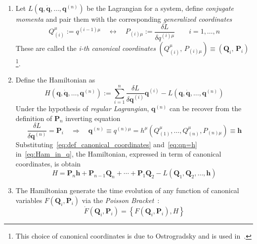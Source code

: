 \begin{enumerate}
  \item Let $L(\bm{q}, \dot{\bm{q}}, \ldots, \bm{q}^{(n)})$ be the Lagrangian
    for a system, define \emph{conjugate momenta} and pair them with the
    corresponding \emph{generalized coordinates}
    \begin{equation} \label{eq:def_canonical_coordinates}
      Q_{(i)}^{\mu} := q^{(i-1)\mu}
      \quad \leftrightarrow \quad
      P_{(i)\mu} := \frac{\delta L}{\delta q^{(i)\mu}}
      \qquad i = 1, \ldots, n
    \end{equation}
    These are called the \emph{i-th canonical coordinates}
    $(Q_{(i)}^{\mu}, \, P_{(i)\mu}) \equiv
    (\bm{Q}_{i}, \, \bm{P}_{i})$\footnote{
      This choice of canonical coordinates is due to Ostrogradsky and is used
      in~\cite{Smilga17, Chen13}.
    }.

  \item Define the Hamiltonian as
    \begin{equation} \label{eq:Ham_in_q}
      H(\bm{q}, \dot{\bm{q}}, \ldots, \bm{q}^{(n)}) :=
      \sum_{i=1}^{n} \frac{\delta L}{\delta \bm{q}^{(i)}} \bm{q}^{(i)} -
      L(\bm{q}, \dot{\bm{q}}, \ldots, \bm{q}^{(n)})
    \end{equation}
    Under the hypothesis of \emph{regular Lagrangian}, $\bm{q}^{(n)}$ can be
    recover from the definition of $\bm{P}_n$ inverting equation
    \begin{equation} \label{eq:qn=h}
      \frac{\delta L}{\delta \bm{q}^{(n)}} = \bm{P}_i
      \quad \Rightarrow \quad
      \bm{q}^{(n)} \equiv q^{(n)\mu} =
      h^{\mu}(Q^{\mu}_{(1)}, \ldots, Q^{\mu}_{(n)}, P_{(n)\mu}) \equiv \bm{h}
    \end{equation}
    Substituting~\eqref{eq:def_canonical_coordinates} and~\eqref{eq:qn=h}
    in~\eqref{eq:Ham_in_q}, the Hamiltonian, expressed in term of canonical
    coordinates, is obtain
    \begin{equation} \label{eq:general_hamiltonian}
      H = \bm{P}_n \bm{h} + \bm{P}_{n-1} \bm{Q}_n + \cdots + \bm{P}_1 \bm{Q}_2
          - L(\bm{Q}_1, \bm{Q}_2, \ldots, \bm{h})
    \end{equation}

  \item The Hamiltonian generate the time evolution of any function of canonical
    variables $F(\bm{Q}_i, \bm{P}_i)$ via the
    \emph{Poisson Bracket}~\cite{Chen13}:
    \begin{equation} \label{eq:poisson_bracket_evolution}
      \dot{F}(\bm{Q}_i, \bm{P}_i) = \left\{
        F(\bm{Q}_i, \bm{P}_i), H
      \right\}
    \end{equation}


\end{enumerate}
